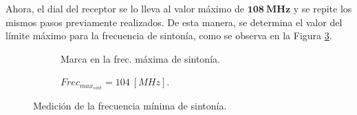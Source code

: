    Ahora, el dial del receptor se lo lleva al valor máximo de \(\mathbf{108~MHz}\) y se 
    repite los mismos pasos previamente realizados. De esta manera, se determina el valor 
    del límite máximo para la frecuencia de sintonía, como se observa en la Figura 
    \ref{fig:FrecMaxtSint}.  
      \begin{figure}[H]
        \centering
        \begin{subfigure}[ht]{0.48\textwidth}
          \caption{Marca en la frec. máxima de sintonía.}
          \label{fig:FrecMaxSintConGen}
        \end{subfigure}
        \hfill 
        \begin{subfigure}[ht]{0.48\textwidth}
          \caption{\(Frec_{max_{sint}} = 104~[MHz]\).}
          \label{fig:FrecMaxSintValor}
        \end{subfigure}
        \caption{Medición de la frecuencia mínima de sintonía.}
        \label{fig:FrecMaxtSint}
      \end{figure}

